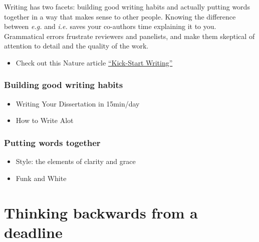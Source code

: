 \documentclass[
  letterpaper,
  DIV=11,
  numbers=noendperiod]{scrreprt}
\providecommand{\tightlist}{%
  \setlength{\itemsep}{0pt}\setlength{\parskip}{0pt}}\usepackage{longtable,booktabs,array}
\begin{document}

Writing has two facets: building good writing habits and actually
putting words together in a way that makes sense to other people.
Knowing the difference between \emph{e.g.} and \emph{i.e.} saves your
co-authors time explaining it to you. Grammatical errors frustrate
reviewers and panelists, and make them skeptical of attention to detail
and the quality of the work.

\begin{itemize}
\tightlist
\item
  Check out this Nature article
  \href{https://www.nature.com/articles/d41586-020-00917-5}{``Kick-Start
  Writing''}
\end{itemize}

\hypertarget{building-good-writing-habits}{%
\subsubsection*{\texorpdfstring{\textbf{Building good writing
habits}}{Building good writing habits}}\label{building-good-writing-habits}}

\begin{itemize}
\item
  Writing Your Dissertation in 15min/day
\item
  How to Write Alot
\end{itemize}

\hypertarget{putting-words-together}{%
\subsubsection*{\texorpdfstring{\textbf{Putting words
together}}{Putting words together}}\label{putting-words-together}}

\begin{itemize}
\item
  Style: the elements of clarity and grace
\item
  Funk and White
\end{itemize}

\hypertarget{thinking-backwards-from-a-deadline}{%
\section*{\texorpdfstring{\textbf{Thinking backwards from a
deadline}}{Thinking backwards from a deadline}}\label{thinking-backwards-from-a-deadline}}
\end{document}
